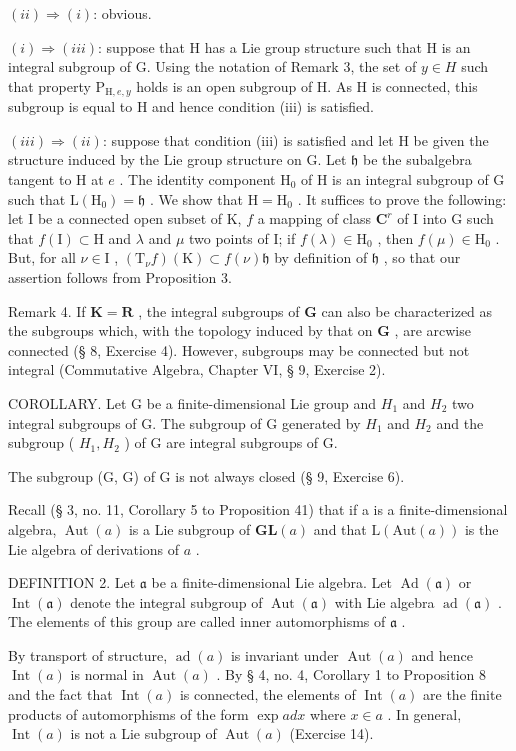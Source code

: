 \((ii) \Rightarrow (i)\): obvious.

\((i) \Rightarrow (iii)\): suppose that H has a Lie group structure such that H is an integral subgroup of G. Using the notation of Remark 3, the set of \(y \in H\) such that property \(\mathrm{P}_{\mathrm{H},e,y}\) holds is an open subgroup of H. As H is connected, this subgroup is equal to H and hence condition (iii) is satisfied.

\((iii) \Rightarrow (ii)\): suppose that condition (iii) is satisfied and let H be given the structure induced by the Lie group structure on G. Let \(\mathfrak{h}\) be the subalgebra tangent to H at \(e\) . The identity component \(\mathrm{H}_0\) of H is an integral subgroup of G such that \(\mathrm{L}(\mathrm{H}_0) = \mathfrak{h}\) . We show that \(\mathrm{H} = \mathrm{H}_0\) . It suffices to prove the following: let I be a connected open subset of K, \(f\) a mapping of class \(\mathbf{C}^r\) of I into G such that \(f(\mathrm{I}) \subset \mathrm{H}\) and \(\lambda\) and \(\mu\) two points of I; if \(f(\lambda) \in \mathrm{H}_0\) , then \(f(\mu) \in \mathrm{H}_0\) . But, for all \(\nu \in \mathrm{I}\) , \((\mathrm{T}_{\nu}f)(\mathrm{K}) \subset f(\nu)\mathfrak{h}\) by definition of \(\mathfrak{h}\) , so that our assertion follows from Proposition 3.

Remark 4. If \(\mathbf{K} = \mathbf{R}\) , the integral subgroups of \(\mathbf{G}\) can also be characterized as the subgroups which, with the topology induced by that on \(\mathbf{G}\) , are arcwise connected (§ 8, Exercise 4). However, subgroups may be connected but not integral (Commutative Algebra, Chapter VI, § 9, Exercise 2).

COROLLARY. Let G be a finite-dimensional Lie group and \(H_{1}\) and \(H_{2}\) two integral subgroups of G. The subgroup of G generated by \(H_{1}\) and \(H_{2}\) and the subgroup ( \(H_{1}, H_{2}\) ) of G are integral subgroups of G.

The subgroup (G, G) of G is not always closed (§ 9, Exercise 6).

Recall (§ 3, no. 11, Corollary 5 to Proposition 41) that if a is a finite-dimensional algebra, \(\operatorname{Aut}(a)\) is a Lie subgroup of \(\mathbf{GL}(a)\) and that \(\mathrm{L}(\mathrm{Aut}(a))\) is the Lie algebra of derivations of \(a\) .

DEFINITION 2. Let \(\mathfrak{a}\) be a finite-dimensional Lie algebra. Let \(\operatorname{Ad}(\mathfrak{a})\) or \(\operatorname{Int}(\mathfrak{a})\) denote the integral subgroup of \(\operatorname{Aut}(\mathfrak{a})\) with Lie algebra \(\operatorname{ad}(\mathfrak{a})\) . The elements of this group are called inner automorphisms of \(\mathfrak{a}\) .

By transport of structure, \(\operatorname{ad}(a)\) is invariant under \(\operatorname{Aut}(a)\) and hence \(\operatorname{Int}(a)\) is normal in \(\operatorname{Aut}(a)\) . By § 4, no. 4, Corollary 1 to Proposition 8 and the fact that \(\operatorname{Int}(a)\) is connected, the elements of \(\operatorname{Int}(a)\) are the finite products of automorphisms of the form \(\exp ad x\) where \(x \in a\) . In general, \(\operatorname{Int}(a)\) is not a Lie subgroup of \(\operatorname{Aut}(a)\) (Exercise 14).

